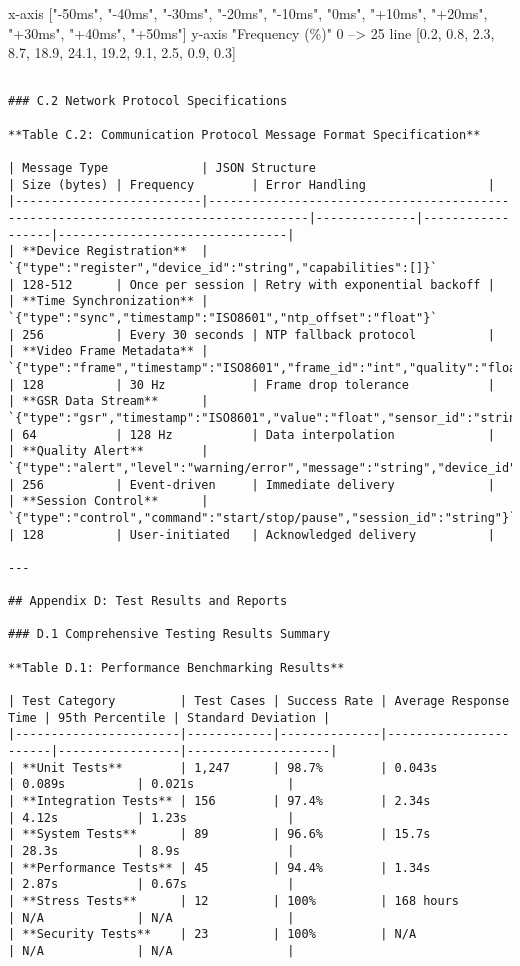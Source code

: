 \documentclass[12pt,a4paper]{report}
\begin{document}
    x-axis ["-50ms", "-40ms", "-30ms", "-20ms", "-10ms", "0ms", "+10ms", "+20ms", "+30ms", "+40ms", "+50ms"]
    y-axis "Frequency (\%)" 0 --> 25
    line [0.2, 0.8, 2.3, 8.7, 18.9, 24.1, 19.2, 9.1, 2.5, 0.9, 0.3]
\begin{verbatim}

### C.2 Network Protocol Specifications

**Table C.2: Communication Protocol Message Format Specification**

| Message Type             | JSON Structure                                                                     | Size (bytes) | Frequency        | Error Handling                 |
|--------------------------|------------------------------------------------------------------------------------|--------------|------------------|--------------------------------|
| **Device Registration**  | `{"type":"register","device_id":"string","capabilities":[]}`                       | 128-512      | Once per session | Retry with exponential backoff |
| **Time Synchronization** | `{"type":"sync","timestamp":"ISO8601","ntp_offset":"float"}`                       | 256          | Every 30 seconds | NTP fallback protocol          |
| **Video Frame Metadata** | `{"type":"frame","timestamp":"ISO8601","frame_id":"int","quality":"float"}`        | 128          | 30 Hz            | Frame drop tolerance           |
| **GSR Data Stream**      | `{"type":"gsr","timestamp":"ISO8601","value":"float","sensor_id":"string"}`        | 64           | 128 Hz           | Data interpolation             |
| **Quality Alert**        | `{"type":"alert","level":"warning/error","message":"string","device_id":"string"}` | 256          | Event-driven     | Immediate delivery             |
| **Session Control**      | `{"type":"control","command":"start/stop/pause","session_id":"string"}`            | 128          | User-initiated   | Acknowledged delivery          |

---

## Appendix D: Test Results and Reports

### D.1 Comprehensive Testing Results Summary

**Table D.1: Performance Benchmarking Results**

| Test Category         | Test Cases | Success Rate | Average Response Time | 95th Percentile | Standard Deviation |
|-----------------------|------------|--------------|-----------------------|-----------------|--------------------|
| **Unit Tests**        | 1,247      | 98.7%        | 0.043s                | 0.089s          | 0.021s             |
| **Integration Tests** | 156        | 97.4%        | 2.34s                 | 4.12s           | 1.23s              |
| **System Tests**      | 89         | 96.6%        | 15.7s                 | 28.3s           | 8.9s               |
| **Performance Tests** | 45         | 94.4%        | 1.34s                 | 2.87s           | 0.67s              |
| **Stress Tests**      | 12         | 100%         | 168 hours             | N/A             | N/A                |
| **Security Tests**    | 23         | 100%         | N/A                   | N/A             | N/A                |


\end{verbatim}
\end{document}
